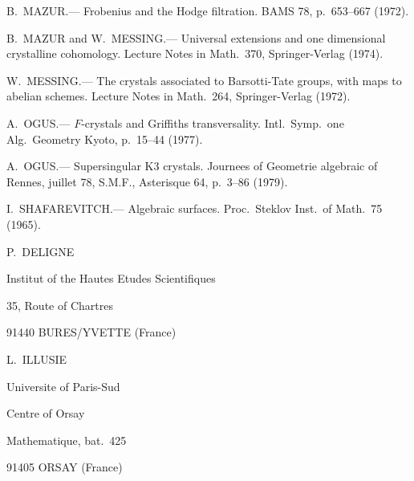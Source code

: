 \documentclass[12pt,a4paper]{article}
\theoremstyle{plain}
\theoremstyle{definition}
\theoremstyle{remark}
\begin{document}
\begin{enumerate}[label={[\arabic*]}, leftmargin=2em, itemsep=0.5ex]
\item B.\ MAZUR.--- Frobenius and the Hodge filtration. BAMS 78, p.\ 653--667 (1972).

\item B.\ MAZUR and W.\ MESSING.--- Universal extensions and one dimensional crystalline cohomology. Lecture Notes in Math.\ 370, Springer-Verlag (1974).

\item W.\ MESSING.--- The crystals associated to Barsotti-Tate groups, with maps to abelian schemes. Lecture Notes in Math.\ 264, Springer-Verlag (1972).

\item A.\ OGUS.--- $F$-crystals and Griffiths transversality. Intl.\ Symp.\ one Alg.\ Geometry Kyoto, p.\ 15--44 (1977).

\item A.\ OGUS.--- Supersingular K3 crystals. Journees of Geometrie algebraic of Rennes, juillet 78, S.M.F., Asterisque 64, p.\ 3--86 (1979).

\item I.\ SHAFAREVITCH.--- Algebraic surfaces. Proc.\ Steklov Inst.\ of Math.\ 75 (1965).
\end{enumerate}

\vspace{1cm}

\noindent
\begin{minipage}[t]{0.45\textwidth}
P.\ DELIGNE

Institut of the Hautes Etudes Scientifiques

35, Route of Chartres

91440 BURES/YVETTE (France)
\end{minipage}
\hfill
\begin{minipage}[t]{0.45\textwidth}
L.\ ILLUSIE

Universite of Paris-Sud

Centre of Orsay

Mathematique, bat.\ 425

91405 ORSAY (France)
\end{minipage}
\end{document}
